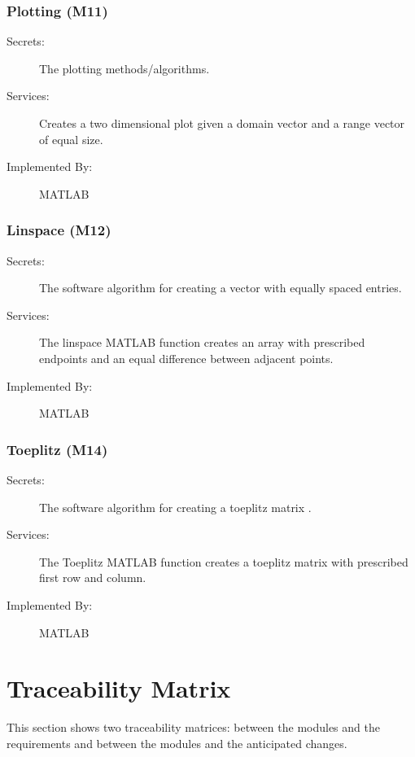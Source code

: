 \documentclass[12pt, titlepage]{article}
\begin{document}
	\subsubsection{Plotting (M11)} \label{M11}
	
	\begin{description}
		\item[Secrets:] The plotting methods/algorithms.
		\item[Services:] Creates a two dimensional plot given a domain vector 
		and a 
		range vector of equal size.  
		\item[Implemented By:] MATLAB
	\end{description} 
	
	\subsubsection{Linspace (M12)} \label{M12}
	
	\begin{description}
		\item[Secrets:] The software algorithm for creating a vector with 
		equally 
		spaced entries. 
		\item[Services:] The linspace MATLAB function creates an array with
		prescribed endpoints and an equal difference between adjacent
		points. 
		\item[Implemented By:] MATLAB
	\end{description} 
	
	\subsubsection{Toeplitz (M14)} \label{M14}
	
	\begin{description}
		\item[Secrets:] The software algorithm for creating a toeplitz matrix .
		\item[Services:] The Toeplitz MATLAB function creates a toeplitz matrix 
		with prescribed first row and column.   
		\item[Implemented By:] MATLAB
	\end{description} 
	
	\section{Traceability Matrix} \label{SecTM}
	
	This section shows two traceability matrices: between the modules and the
	requirements and between the modules and the anticipated changes.
	
\end{document}
